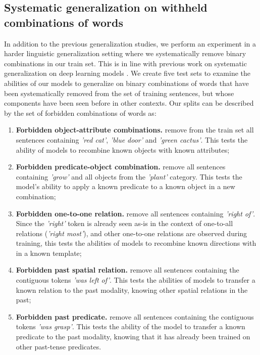 \subsection{Systematic generalization on withheld combinations of words}\label{sys_split}


 In addition to the previous generalization studies, we perform an experiment in a harder linguistic generalization setting where we systematically remove binary combinations in our train set. This is in line with previous work on systematic generalization on deep learning models \cite{lake2018generalization, ruis2020benchmark, hupkes2020compositionality}. We create five test sets to examine the abilities of our models to generalize on binary combinations of words that have been systematically removed from the set of training sentences, but whose components have been seen before in other contexts. Our splits can be described by the set of forbidden combinations of words as:
%
\begin{enumerate}[noitemsep]
    \item \textbf{Forbidden object-attribute combinations.} remove from the train set all sentences containing \textit{'red cat'}, \textit{'blue door'} and \textit{'green cactus'}. This tests the ability of models to recombine known objects with known attributes;
    \item \textbf{Forbidden predicate-object combination.} remove all sentences containing \textit{'grow'} and all objects from the \textit{'plant'} category. This tests the model's ability to apply a known predicate to a known object in a new combination;
    \item \textbf{Forbidden one-to-one relation.} remove all sentences containing \textit{'right of'}. Since the \textit{'right'} token is already seen as-is in the context of one-to-all relations (\textit{'right most'}), and other one-to-one relations are observed during training, this tests the abilities of models to recombine known directions with in a known template;
    \item \textbf{Forbidden past spatial relation.} remove all sentences containing the contiguous tokens \textit{'was left of'}. This tests the abilities of models to transfer a known relation to the past modality, knowing other spatial relations in the past;
    \item \textbf{Forbidden past predicate.} remove all sentences containing the contiguous tokens \textit{'was grasp'}. This tests the ability of the model to transfer a known predicate to the past modality, knowing that it has already been trained on other past-tense predicates.
\end{enumerate}

